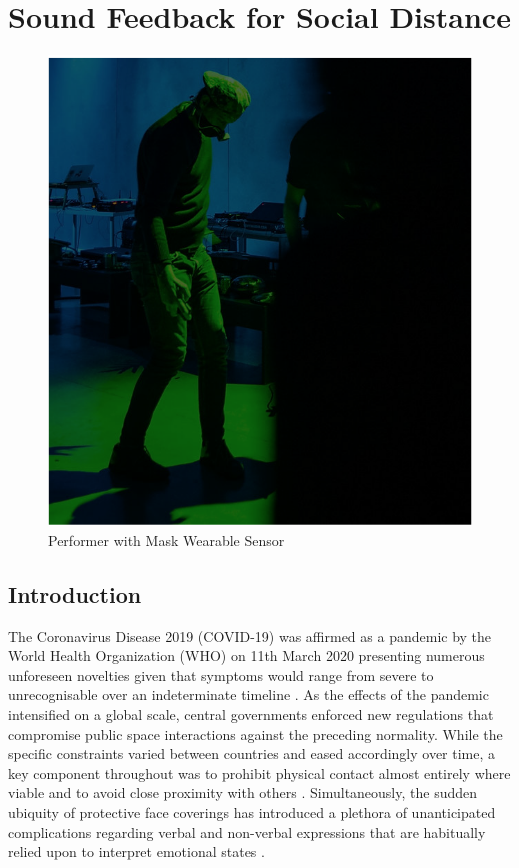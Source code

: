 
\section{Sound Feedback for Social Distance}
\label{case_studies:adse_ess}

\begin{figure}[!h]
\captionsetup{width=1.0\textwidth}
\centering
\includegraphics[width=0.75
\textwidth,keepaspectratio]{Chapters/Figures/adse_ess/CSL_MASK_MICK.png}
{\caption{Performer with Mask Wearable Sensor
}\label{fig:sensor_model}}
\end{figure}

\subsection{Introduction}

The Coronavirus Disease 2019 (COVID-19) was affirmed as a pandemic by the World Health Organization (WHO) on 11th March 2020 \citep{cucinotta_who_2020} presenting numerous unforeseen novelties given that symptoms would range from severe to unrecognisable over an indeterminate timeline \citep{woelfel_clinical_2020}. As the effects of the pandemic intensified on a global scale, central governments enforced new regulations that compromise public space interactions against the preceding normality. While the specific constraints varied between countries and eased accordingly over time, a key component throughout was to prohibit physical contact almost entirely where viable and to avoid close proximity with others \citep{toquero_challenges_2020, uk_department_of_health_and_social_care_coronavirus_2020}. Simultaneously, the sudden ubiquity of protective face coverings has introduced a plethora of unanticipated complications regarding verbal and non-verbal expressions that are habitually relied upon to interpret emotional states \citep{marta_i_2020,carbon_wearing_2020,grundmann_face_2020}.

